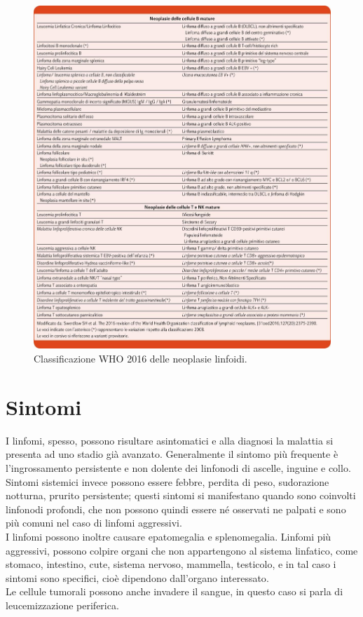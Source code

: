 \begin{figure}[H]
    \begin{center}
    \includegraphics[width=1.0\columnwidth]{img/CLASS.WHO.jpeg}
    \vspace{-3mm}
    \end{center}
    \caption{Classificazione WHO 2016 delle neoplasie linfoidi.
    \cite{img15-18}}
    \label{fig:FIGURE_2.13}
\end{figure}

\section{Sintomi}
I linfomi, spesso, possono risultare asintomatici e alla diagnosi la malattia si presenta ad uno stadio già avanzato.
Generalmente il sintomo più frequente è l’ingrossamento persistente e non dolente dei linfonodi di ascelle, inguine e 
collo\cite{LNHAIL}.\\ 
Sintomi sistemici invece possono essere febbre, perdita di peso, sudorazione notturna, prurito persistente; 
questi sintomi si manifestano quando sono coinvolti linfonodi profondi, che non possono quindi essere né osservati 
ne palpati e sono più comuni nel caso di linfomi aggressivi.\\ 
I linfomi possono inoltre causare epatomegalia e splenomegalia\cite{AMERICANCANCER}. 
Linfomi più aggressivi, possono colpire organi che non appartengono al sistema linfatico, come stomaco, intestino, 
cute, sistema nervoso, mammella, testicolo, e in tal caso i sintomi sono specifici, cioè dipendono 
dall’organo interessato\cite{AMERICANCANCER}.\\ 
Le cellule tumorali possono anche invadere il sangue, in questo caso si parla di leucemizzazione periferica\cite{LNHAIL}.

